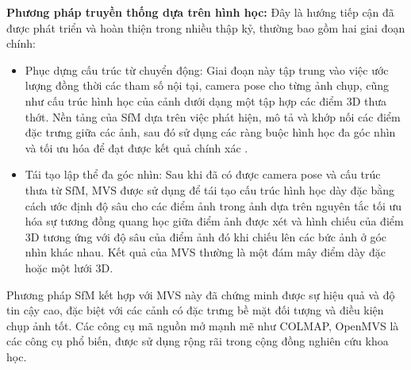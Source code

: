 \textbf{Phương pháp truyền thống dựa trên hình học:} Đây là hướng tiếp cận đã được phát triển và hoàn thiện trong nhiều thập kỷ, thường bao gồm hai giai đoạn chính:
\begin{itemize}
    \item Phục dựng cấu trúc từ chuyển động: Giai đoạn này tập trung vào việc ước lượng đồng thời các tham số nội tại, camera pose cho từng ảnh chụp, cũng như cấu trúc hình học của cảnh dưới dạng một tập hợp các điểm 3D thưa thớt. Nền tảng của SfM dựa trên việc phát hiện, mô tả và khớp nối các điểm đặc trưng giữa các ảnh, sau đó sử dụng các ràng buộc hình học đa góc nhìn và tối ưu hóa để đạt được kết quả chính xác \cite{Schonberger16SFMRevisited}. 
    \item Tái tạo lập thể đa góc nhìn: Sau khi đã có được camera pose và cấu trúc thưa từ SfM, MVS được sử dụng để tái tạo cấu trúc hình học dày đặc bằng cách ước định độ sâu cho các điểm ảnh trong ảnh dựa trên nguyên tắc tối ưu hóa sự tương đồng quang học giữa điểm ảnh được xét và hình chiếu của điểm 3D tương ứng với độ sâu của điểm ảnh đó khi chiếu lên các bức ảnh ở góc nhìn khác nhau\cite{Seitz2006comparison, Furukawa2015multi}. Kết quả của MVS thường là một đám mây điểm dày đặc hoặc một lưới 3D.
\end{itemize}
Phương pháp SfM kết hợp với MVS này đã chứng minh được sự hiệu quả và độ tin cậy cao, đặc biệt với các cảnh có đặc trưng bề mặt đối tượng và điều kiện chụp ảnh tốt. Các công cụ mã nguồn mở mạnh mẽ như COLMAP, OpenMVS là các công cụ phổ biến, được sử dụng rộng rãi trong cộng đồng nghiên cứu khoa học.

